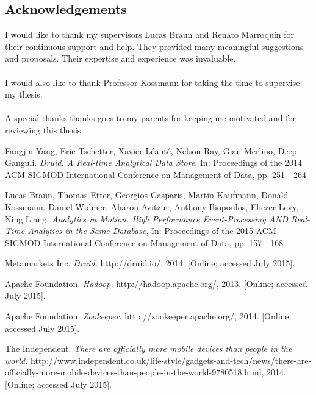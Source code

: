 \documentclass[11pt,singlecolumn]{scrartcl}
\begin{document}
\subsection{Acknowledgements}
I would like to thank my supervisors Lucas Braun and Renato Marroquín for their continuous support and help. They provided many meaningful suggestions and proposals. Their expertise and experience was invaluable.\\\\
I would also like to thank Professor Kossmann for taking the time to supervise my thesis.\\\\
A special thanks thanks goes to my parents for keeping me motivated and for reviewing this thesis.

\clearpage

\begin{thebibliography}{1}
 Fangjin Yang, Eric Tschetter, Xavier Léauté, Nelson Ray, Gian Merlino, Deep Ganguli.
{\em Druid. A Real-time Analytical Data Store}, In: Proceedings of the 2014 ACM SIGMOD International Conference on Management of Data, pp. 251 - 264

 Lucas Braun, Thomas Etter, Georgios Gasparis,
Martin Kaufmann, Donald Kossmann, Daniel Widmer, Aharon Avitzur, Anthony Iliopoulos, Eliezer Levy, Ning Liang.
{\em Analytics in Motion. High Performance Event-Processing AND Real-Time Analytics in the Same Database}, In: Proceedings of the 2015 ACM SIGMOD International Conference on Management of Data, pp. 157 - 168

Metamarkets Inc. {\em Druid.} http://druid.io/, 2014. [Online; accessed July 2015].

Apache Foundation. {\em Hadoop.} http://hadoop.apache.org/, 2013. [Online; accessed July 2015].

Apache Foundation. {\em Zookeeper.} http://zookeeper.apache.org/, 2014. [Online; accessed July 2015].

 The Independent. {\em There are officially more mobile devices than people in the world.} http://www.independent.co.uk/life-style/gadgets-and-tech/news/there-are-officially-more-mobile-devices-than-people-in-the-world-9780518.html, 2014. [Online; accessed July 2015].

\end{thebibliography}
\end{document}
